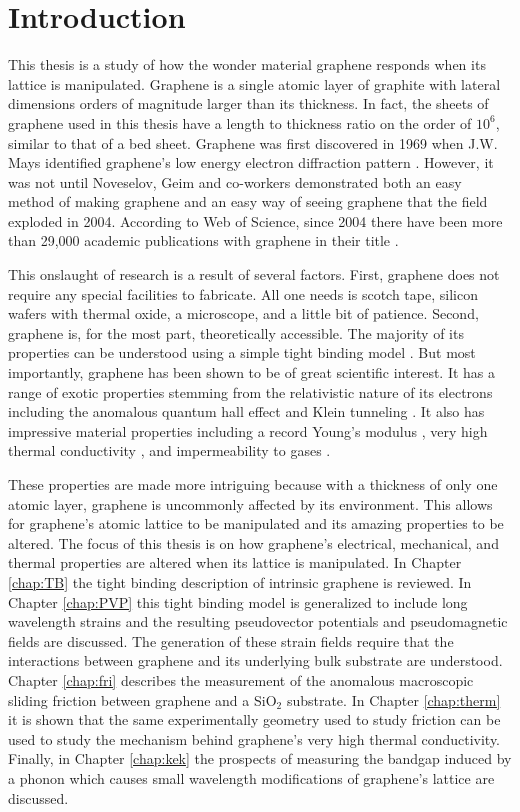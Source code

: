 \chapter{Introduction}
This thesis is a study of how the wonder material graphene responds when its lattice is manipulated.
Graphene is a single atomic layer of graphite with lateral dimensions orders of magnitude larger than its thickness.
In fact, the sheets of graphene used in this thesis have a length to thickness ratio on the order of $10^6$, similar to that of a bed sheet.
Graphene was first discovered in 1969 when J.W. Mays identified graphene's low energy electron diffraction pattern \cite{May1969}. 
However, it was not until Noveselov, Geim and co-workers demonstrated both an easy method of making graphene and an easy way of seeing graphene \cite{Novoselov2004} that the field exploded in 2004.
According to Web of Science, since 2004 there have been more than 29,000 academic publications with graphene in their title \cite{WoS}.

This onslaught of research is a result of several factors.
First, graphene does not require any special facilities to fabricate.
All one needs is scotch tape, silicon wafers with thermal oxide, a microscope, and a little bit of patience.
Second, graphene is, for the most part, theoretically accessible.
The majority of its properties can be understood using a simple tight binding model \cite{CastroNeto2009}.
But most importantly, graphene has been shown to be of great scientific interest.
It has a range of exotic properties stemming from the relativistic nature of its electrons including the anomalous quantum hall effect \cite{Zhang2005} and Klein tunneling \cite{Young2009}.
It also has impressive material properties including a record Young’s modulus \cite{Lee2008}, very high thermal conductivity \cite{Faugeras2010}, and impermeability to gases \cite{Bunch2008}.

These properties are made more intriguing because with a thickness of only one atomic layer, graphene is uncommonly affected by its environment.
This allows for graphene's atomic lattice to be manipulated and its amazing properties to be altered.
The focus of this thesis is on how graphene's electrical, mechanical, and thermal properties are altered when its lattice is manipulated.
In Chapter \ref{chap:TB} the tight binding description of intrinsic graphene is reviewed.
In Chapter \ref{chap:PVP} this tight binding model is generalized to include long wavelength strains and the resulting pseudovector potentials and pseudomagnetic fields are discussed.
The generation of these strain fields require that the interactions between graphene and its underlying bulk substrate are understood.
Chapter \ref{chap:fri} describes the measurement of the anomalous macroscopic sliding friction between graphene and a SiO$_2$ substrate.
In Chapter \ref{chap:therm} it is shown that the same experimentally geometry used to study friction can be used to study the mechanism behind graphene's very high thermal conductivity.
Finally, in Chapter \ref{chap:kek} the prospects of measuring the bandgap induced by a phonon which causes small wavelength modifications of graphene's lattice are discussed.